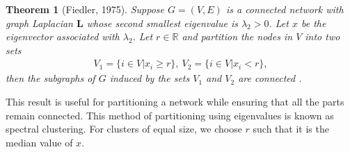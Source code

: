 \documentclass[10pt,a4paper]{article}
\newtheorem{thm}{Theorem}
\begin{document}
\begin{thm}[Fiedler, 1975]
	Suppose $G = (V,E)$ is a connected network with graph Laplacian $\mathbf{L}$ whose second smallest eigenvalue is $\lambda_2 > 0$. Let $x$ be the eigenvector associated with $\lambda_2$. Let $r \in \mathbb{R}$ and partition the nodes in $V$ into two sets
	\begin{eqnarray}
	V_1 = \{i \in V|x_i \geq r\}, ~ V_2 = \{i \in V | x_i < r\}, 
	\end{eqnarray}
	then the subgraphs of $G$ induced by the sets $V_1$ and $V_2$ are connected \citep{estrada2015first}.
	\label{fiedler}
\end{thm}
This result is useful for partitioning a network while ensuring that all the parts remain connected. This method of partitioning using eigenvalues is known as spectral clustering. For clusters of equal size, we choose $r$ such that it is the median value of $x$. 
\end{document}
